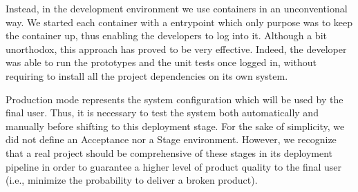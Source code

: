 Instead, in the development environment we use containers in an unconventional
way. We started each container with a entrypoint which
only purpose was to keep the container up, thus enabling the developers to log into it.
Although a bit unorthodox, this approach has proved to be very effective.
Indeed, the developer was able to run the prototypes and the unit tests once
logged in, without requiring to install all the project dependencies on its
own system.


Production mode represents the system configuration which will be used by the final user. Thus, it is necessary
to test the system both automatically and manually before shifting to this deployment stage. For the sake of
simplicity, we did not define an Acceptance nor a Stage environment. However,
we recognize that a real project should be comprehensive of these
stages in its deployment pipeline in order to guarantee a higher level of
product quality to the final user (i.e., minimize the probability to deliver a
broken product).

